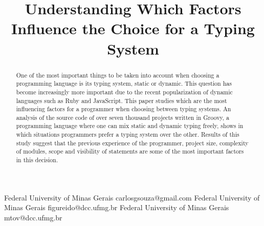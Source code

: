 \documentclass[preprint]{sigplanconf}
\begin{document}
\setlength{\pdfpageheight}{\paperheight}
\setlength{\pdfpagewidth}{\paperwidth}






\title{Understanding Which Factors Influence the Choice for a Typing System}

           {Federal University of Minas Gerais}
           {carlosgsouza@gmail.com}
           {Federal University of Minas Gerais}
           {figureido@dcc.ufmg.br}
           {Federal University of Minas Gerais}
           {mtov@dcc.ufmg.br}

\maketitle

\begin{abstract}
One of the most important things to be taken into account when choosing a programming language is its typing system, static or dynamic. 
This question has become increasingly more important due to the recent popularization of dynamic languages such as Ruby and JavaScript. 
This paper studies which are the most influencing factors for a programmer when choosing between typing systems. 
An analysis of the source code of over seven thousand projects written in Groovy, a programming language where one can mix static and dynamic typing freely, shows in which situations programmers prefer a typing system over the other. 
Results of this study suggest that the previous experience of the programmer, project size, complexity of modules, scope and visibility of statements are some of the most important factors in this decision.
\end{abstract}
\end{document}

